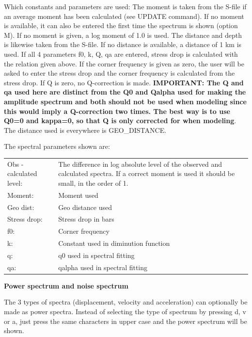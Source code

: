 Which constants and parameters are used: The moment is taken from the S-file if an average moment has been calculated (see UPDATE command). If no moment is available, it can also be entered the first time the spectrum is shown (option M). If no moment is given, a log moment of 1.0 is used. The distance and depth is likewise taken from the S-file. If no distance is available, a distance of 1 km is used. If all 4 parameters f0, k, Q, qa are entered, stress drop is calculated with the relation given above. If the corner frequency is given as zero, the user will be asked to enter the stress drop and the corner frequency is calculated from the stress drop. If Q is zero, no Q-correction is made. \textbf{IMPORTANT: The Q and qa used here are distinct from the Q0 and Qalpha used for making the amplitude spectrum and both should not be used when modeling since this would imply  a Q-correction two times. The best way is to use Q0=0 and kappa=0, so that Q is only corrected for when modeling}. The distance used is everywhere is GEO\_DISTANCE. 

The spectral parameters shown are: 

\begin{tabular}{|lp{9cm}|}
\hline
Obs - calculated level: & The difference in log absolute level of the observed and calculated  
spectra. If a correct moment is used it should be small, 
in the order of 1. \\
Moment: & Moment used \\
Geo dist: & Geo distance used \\
Stress drop: & Stress drop in bars \\
f0: & Corner frequency \\
k: & Constant used in diminution function \\
q: & q0 used in spectral fitting \\
qa: & qalpha used in spectral fitting \\
\hline
\end{tabular}
\newline

\textbf{Power spectrum and noise spectrum}

The 3 types of spectra (displacement, velocity and acceleration) can optionally be made as power spectra. Instead of selecting the type of spectrum by pressing d, v or a, just press the same characters in upper case and the power spectrum will be shown. 

